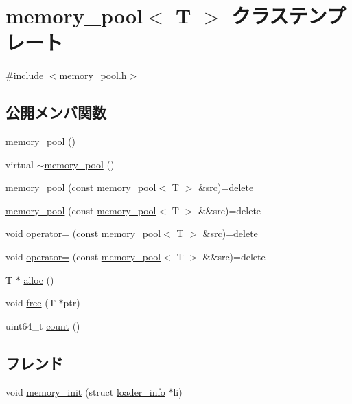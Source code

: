 \hypertarget{classmemory__pool}{}\section{memory\+\_\+pool$<$ T $>$ クラステンプレート}
\label{classmemory__pool}


{\ttfamily \#include $<$memory\+\_\+pool.\+h$>$}

\subsection*{公開メンバ関数}
\begin{DoxyCompactItemize}
\item 
\hyperlink{classmemory__pool_aefcedeb50bbee5b4b55add4cff1dc1cd}{memory\+\_\+pool} ()
\item 
virtual \hyperlink{classmemory__pool_a3431323fb4ac4b685b0e7a6c1da2094d}{$\sim$memory\+\_\+pool} ()
\item 
\hyperlink{classmemory__pool_a38c023c3361ac0ee78d8e34ab7f8d668}{memory\+\_\+pool} (const \hyperlink{classmemory__pool}{memory\+\_\+pool}$<$ T $>$ \&src)=delete
\item 
\hyperlink{classmemory__pool_acff04411638a2a888d522194b2283b5d}{memory\+\_\+pool} (const \hyperlink{classmemory__pool}{memory\+\_\+pool}$<$ T $>$ \&\&src)=delete
\item 
void \hyperlink{classmemory__pool_a9ee94bfc4a06a78ed9b276c890b5d469}{operator=} (const \hyperlink{classmemory__pool}{memory\+\_\+pool}$<$ T $>$ \&src)=delete
\item 
void \hyperlink{classmemory__pool_afbde5b0e1d4ef84d03837e5dbb8bac47}{operator=} (const \hyperlink{classmemory__pool}{memory\+\_\+pool}$<$ T $>$ \&\&src)=delete
\item 
T $\ast$ \hyperlink{classmemory__pool_ab5d59f7eeb28c0c983bc68566a375a14}{alloc} ()
\item 
void \hyperlink{classmemory__pool_a18de6da11b20cc568984d3e9fa98015f}{free} (T $\ast$ptr)
\item 
uint64\+\_\+t \hyperlink{classmemory__pool_a601585beead8633f1253c976d75ce916}{count} ()
\end{DoxyCompactItemize}
\subsection*{フレンド}
\begin{DoxyCompactItemize}
\item 
void \hyperlink{classmemory__pool_a8840f01b46a3b9c43a461591a579c1bd}{memory\+\_\+init} (struct \hyperlink{structloader__info}{loader\+\_\+info} $\ast$li)
\end{DoxyCompactItemize}


